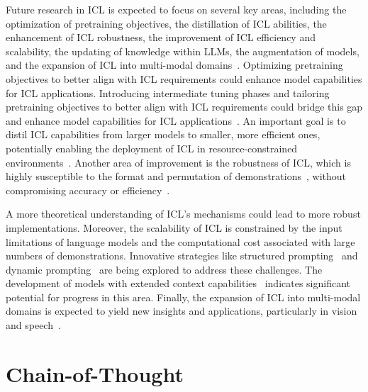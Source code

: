 Future research in ICL is expected to focus on several key areas, including the optimization of pretraining objectives, the distillation of ICL abilities, the enhancement of ICL robustness, the improvement of ICL efficiency and scalability, the updating of knowledge within LLMs, the augmentation of models, and the expansion of ICL into multi-modal domains~\cite{dong2023survey}.
Optimizing pretraining objectives to better align with ICL requirements could enhance model capabilities for ICL applications.
Introducing intermediate tuning phases and tailoring pretraining objectives to better align with ICL requirements could bridge this gap and enhance model capabilities for ICL applications~\cite{shin2022effect}.
An important goal is to distil ICL capabilities from larger models to smaller, more efficient ones, potentially enabling the deployment of ICL in resource-constrained environments~\cite{magister2022teaching}.
Another area of improvement is the robustness of ICL, which is highly susceptible to the format and permutation of demonstrations~\cite{zhao2021calibrate, lu2022fantastically}, without compromising accuracy or efficiency~\cite{chen2024relation}.

A more theoretical understanding of ICL's mechanisms could lead to more robust implementations.
Moreover, the scalability of ICL is constrained by the input limitations of language models and the computational cost associated with large numbers of demonstrations.
Innovative strategies like structured prompting~\cite{hao2022structured} and dynamic prompting~\cite{wang2023efficient} are being explored to address these challenges.
The development of models with extended context capabilities~\cite{li2023contextual} indicates significant potential for progress in this area.
Finally, the expansion of ICL into multi-modal domains is expected to yield new insights and applications, particularly in vision and speech~\cite{dong2023survey}.


\section{Chain-of-Thought}
\label{sec:chain-of-thought}

